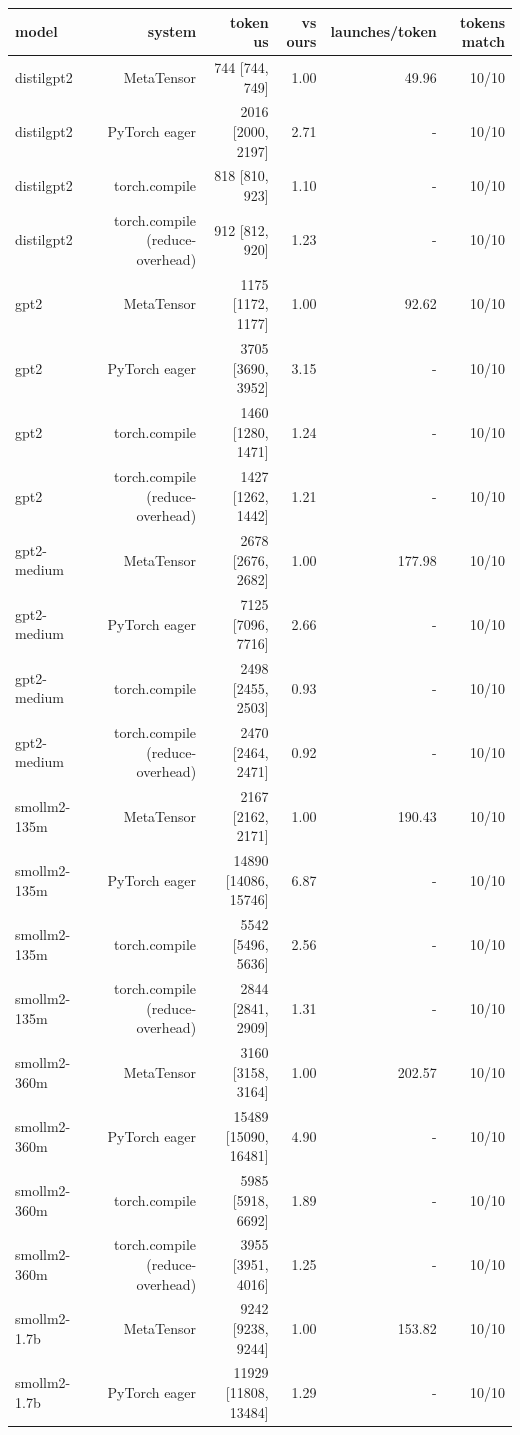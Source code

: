 \begin{tabular}{lrrrrr}
\toprule
model & system & token us & vs ours & launches/token & tokens match \\
\midrule
distilgpt2 & MetaTensor & 744 [744, 749] & 1.00 & 49.96 & 10/10 \\
distilgpt2 & PyTorch eager & 2016 [2000, 2197] & 2.71 & - & 10/10 \\
distilgpt2 & torch.compile & 818 [810, 923] & 1.10 & - & 10/10 \\
distilgpt2 & torch.compile (reduce-overhead) & 912 [812, 920] & 1.23 & - & 10/10 \\
gpt2 & MetaTensor & 1175 [1172, 1177] & 1.00 & 92.62 & 10/10 \\
gpt2 & PyTorch eager & 3705 [3690, 3952] & 3.15 & - & 10/10 \\
gpt2 & torch.compile & 1460 [1280, 1471] & 1.24 & - & 10/10 \\
gpt2 & torch.compile (reduce-overhead) & 1427 [1262, 1442] & 1.21 & - & 10/10 \\
gpt2-medium & MetaTensor & 2678 [2676, 2682] & 1.00 & 177.98 & 10/10 \\
gpt2-medium & PyTorch eager & 7125 [7096, 7716] & 2.66 & - & 10/10 \\
gpt2-medium & torch.compile & 2498 [2455, 2503] & 0.93 & - & 10/10 \\
gpt2-medium & torch.compile (reduce-overhead) & 2470 [2464, 2471] & 0.92 & - & 10/10 \\
smollm2-135m & MetaTensor & 2167 [2162, 2171] & 1.00 & 190.43 & 10/10 \\
smollm2-135m & PyTorch eager & 14890 [14086, 15746] & 6.87 & - & 10/10 \\
smollm2-135m & torch.compile & 5542 [5496, 5636] & 2.56 & - & 10/10 \\
smollm2-135m & torch.compile (reduce-overhead) & 2844 [2841, 2909] & 1.31 & - & 10/10 \\
smollm2-360m & MetaTensor & 3160 [3158, 3164] & 1.00 & 202.57 & 10/10 \\
smollm2-360m & PyTorch eager & 15489 [15090, 16481] & 4.90 & - & 10/10 \\
smollm2-360m & torch.compile & 5985 [5918, 6692] & 1.89 & - & 10/10 \\
smollm2-360m & torch.compile (reduce-overhead) & 3955 [3951, 4016] & 1.25 & - & 10/10 \\
smollm2-1.7b & MetaTensor & 9242 [9238, 9244] & 1.00 & 153.82 & 10/10 \\
smollm2-1.7b & PyTorch eager & 11929 [11808, 13484] & 1.29 & - & 10/10 \\

\end{tabular}
